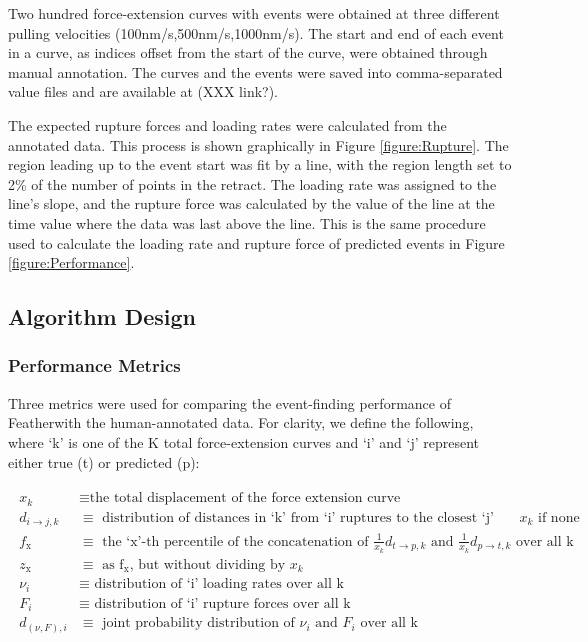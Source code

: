 \documentclass[%
  aip,12pt,tightenlines,
  amsthm,
 amsmath,amssymb
]{article}
\newcommand{\eqs}[1]{
\begin{align*} 
\begin{split}
#1
\end{split}					
\end{align*}}
\newcommand{\fRef}[1]{Figure \ref{figure:#1}}
\newcommand{\sLabel}[1]{\label{section:#1}}
\newcommand{\firstp}[0]{}
\newcommand{\pl}[0]{\vspace{6pt}}
\newcommand{\name}[0]{Feather}
\begin{document}
\firstp Two hundred force-extension curves with events were obtained at three different pulling velocities (100nm/s,500nm/s,1000nm/s). The start and end of each event in a curve, as indices offset from the start of the curve, were obtained through manual annotation. The curves and the events were saved into comma-separated value files and are available at (XXX link?). \pl

The expected rupture forces and loading rates were calculated from the annotated data. This process is shown graphically in \fRef{Rupture}. The region leading up to the event start was fit by a line, with the region length set to 2\% of the number of points in the retract. The loading rate was assigned to the line's slope, and the rupture force was calculated by the value of the line at the time value where the data was last above the line. This is the same procedure used to calculate the loading rate and rupture force of predicted events in \fRef{Performance}. \pl



\subsection{\sLabel{Algorithm}Algorithm Design}


\subsubsection{\sLabel{Metrics}Performance Metrics}

\firstp Three metrics were used for comparing the event-finding performance of \name with the human-annotated data. For clarity, we define the following, where `k' is one of the K total force-extension curves and `i' and `j' represent either true (t) or predicted (p): \pl

\eqs{ 
x_k &\equiv \text{the total displacement of the force extension curve} \\
d_{i\rightarrow j,k} &\equiv \text{ distribution of distances in `k' from `i' ruptures to the closest `j' ruptures in or $x_k$ if none } \\
f_{\text{x}} &\equiv \text{ the `x'-th percentile of the concatenation of } \frac{1}{x_k}d_{t\rightarrow p,k} \text{ and } \frac{1}{x_k}d_{p\rightarrow t,k} \text{ over all k } \\
z_{\text{x}} &\equiv \text{ as f$_{\text{x}}$, but without dividing by $x_k$}\\
\nu_i &\equiv \text{ distribution of `i' loading rates over all k} \\
F_i &\equiv \text{ distribution of `i' rupture forces over all k} \\
d_{(\nu,F),i} &\equiv \text{ joint probability distribution of $\nu_i$ and $F_i$ over all k} \\
 }
\end{document}
